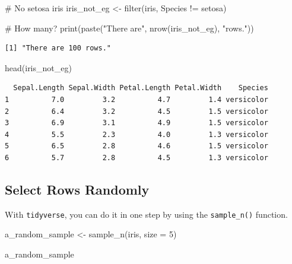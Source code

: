 \documentclass[
  letterpaper,
  DIV=11,
  numbers=noendperiod]{scrreprt}
\newenvironment{Shaded}{\begin{snugshade}}{\end{snugshade}}
\newcommand{\AttributeTok}[1]{\textcolor[rgb]{0.40,0.45,0.13}{#1}}
\newcommand{\CommentTok}[1]{\textcolor[rgb]{0.37,0.37,0.37}{#1}}
\newcommand{\DecValTok}[1]{\textcolor[rgb]{0.68,0.00,0.00}{#1}}
\newcommand{\FunctionTok}[1]{\textcolor[rgb]{0.28,0.35,0.67}{#1}}
\newcommand{\NormalTok}[1]{\textcolor[rgb]{0.00,0.23,0.31}{#1}}
\newcommand{\OtherTok}[1]{\textcolor[rgb]{0.00,0.23,0.31}{#1}}
\newcommand{\SpecialCharTok}[1]{\textcolor[rgb]{0.37,0.37,0.37}{#1}}
\newcommand{\StringTok}[1]{\textcolor[rgb]{0.13,0.47,0.30}{#1}}
\begin{document}
\begin{Shaded}
\begin{Highlighting}[]
\CommentTok{\# No setosa iris}
\NormalTok{iris\_not\_eg }\OtherTok{\textless{}{-}} \FunctionTok{filter}\NormalTok{(iris, Species }\SpecialCharTok{!=} \StringTok{\textquotesingle{}setosa\textquotesingle{}}\NormalTok{)}

\CommentTok{\# How many?}
\FunctionTok{print}\NormalTok{(}\FunctionTok{paste}\NormalTok{(}\StringTok{"There are"}\NormalTok{, }\FunctionTok{nrow}\NormalTok{(iris\_not\_eg), }\StringTok{"rows."}\NormalTok{))}
\end{Highlighting}
\end{Shaded}

\begin{verbatim}
[1] "There are 100 rows."
\end{verbatim}

\begin{Shaded}
\begin{Highlighting}[]
\FunctionTok{head}\NormalTok{(iris\_not\_eg)}
\end{Highlighting}
\end{Shaded}

\begin{verbatim}
  Sepal.Length Sepal.Width Petal.Length Petal.Width    Species
1          7.0         3.2          4.7         1.4 versicolor
2          6.4         3.2          4.5         1.5 versicolor
3          6.9         3.1          4.9         1.5 versicolor
4          5.5         2.3          4.0         1.3 versicolor
5          6.5         2.8          4.6         1.5 versicolor
6          5.7         2.8          4.5         1.3 versicolor
\end{verbatim}

\subsection{Select Rows Randomly}\label{select-rows-randomly}

With \texttt{tidyverse}, you can do it in one step by using the
\texttt{sample\_n()} function.

\begin{Shaded}
\begin{Highlighting}[]
\NormalTok{a\_random\_sample }\OtherTok{\textless{}{-}} \FunctionTok{sample\_n}\NormalTok{(iris, }\AttributeTok{size =} \DecValTok{5}\NormalTok{)}

\NormalTok{a\_random\_sample}
\end{Highlighting}
\end{Shaded}
\end{document}
